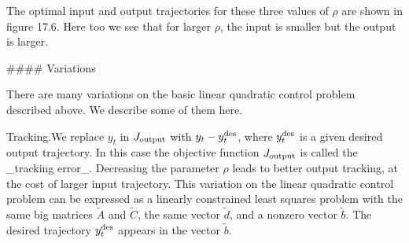 The optimal input and output trajectories for these three values of \(\rho\) are shown in figure 17.6. Here too we see that for larger \(\rho\), the input is smaller but the output is larger.

#### Variations

There are many variations on the basic linear quadratic control problem described above. We describe some of them here.

Tracking.We replace \(y_{t}\) in \(J_{\rm output}\) with \(y_{t}-y_{t}^{\rm des}\), where \(y_{t}^{\rm des}\) is a given desired output trajectory. In this case the objective function \(J_{\rm output}\) is called the _tracking error_. Decreasing the parameter \(\rho\) leads to better output tracking, at the cost of larger input trajectory. This variation on the linear quadratic control problem can be expressed as a linearly constrained least squares problem with the same big matrices \(\tilde{A}\) and \(\tilde{C}\), the same vector \(\tilde{d}\), and a nonzero vector \(\tilde{b}\). The desired trajectory \(y_{t}^{\rm des}\) appears in the vector \(\tilde{b}\).

 